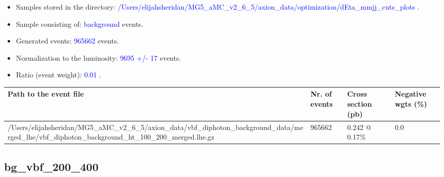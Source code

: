 \documentclass[a4paper, 10pt]{article}
\begin{document}
\begin{itemize}
  \item Samples stored in the directory: \textcolor{blue}{/\-Users/\-elijahsheridan/\-MG5\_aMC\_v2\_6\_5/\-axion\_data/\-optimization/\-dEta\_mmjj\_cuts\_plots} .
   \item Sample consisting of: \textcolor{blue}{background}  events.
   \item Generated events: \textcolor{blue}{965662 }  events.
   \item Normalization to the luminosity: \textcolor{blue}{9695}\textcolor{blue}{ +/\-- }\textcolor{blue}{17 }  events.
   \item Ratio (event weight): \textcolor{blue}{0.01 } .  
 
\end{itemize}
\begin{table}[H]
  \begin{center}
    \begin{tabular}{|m{55.0mm}|m{25.0mm}|m{30.0mm}|m{30.0mm}|}
      \hline
      {\cellcolor{yellow}         Path to the event file}& {\cellcolor{yellow}         Nr. of events}& {\cellcolor{yellow}         Cross section (pb)}& {\cellcolor{yellow}         Negative wgts (\%)}\\
      \hline
      {\cellcolor{white}          /\-Users/\-elijahsheridan/\-MG5\_aMC\_v2\_6\_5/\-axion\_data/\-vbf\_diphoton\_background\_data/\-merged\_lhe/\-vbf\_diphoton\_background\_ht\_100\_200\_merged.lhe.gz}& {\cellcolor{white}          965662}& {\cellcolor{white}          0.242 @ 0.17\%}& {\cellcolor{white}          0.0}\\
\hline
    \end{tabular}
  \end{center}
\end{table}

\subsection{ bg\_vbf\_200\_400}
\end{document}
